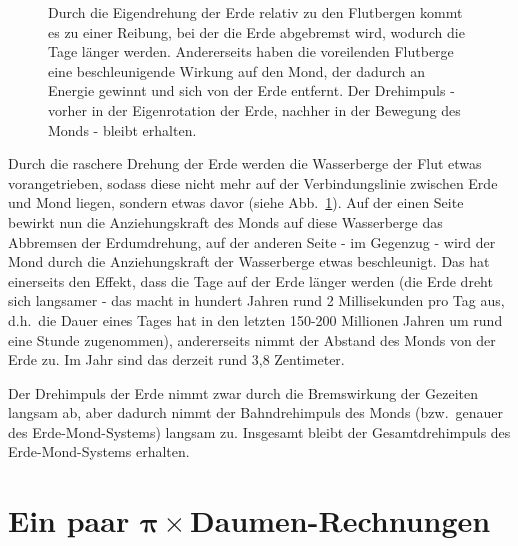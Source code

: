 \begin{figure}[htb]
%
\caption{\label{fig_Bremsen}%
Durch die Eigendrehung der Erde relativ zu den Flutbergen kommt es zu einer
\glqq Reibung\grqq, bei der die Erde abgebremst wird, wodurch die Tage 
l\"anger werden. Andererseits haben die voreilenden Flutberge eine beschleunigende
Wirkung auf den Mond, der
dadurch an Energie gewinnt und sich von der Erde entfernt. Der Drehimpuls - vorher
in der Eigenrotation der Erde, nachher in der Bewegung des Monds - bleibt erhalten.}
\end{figure}

Durch die raschere Drehung der Erde werden die Wasserberge der Flut etwas
vorangetrieben, sodass diese nicht mehr auf der Verbindungslinie zwischen Erde und
Mond liegen, sondern etwas davor (siehe Abb.\ \ref{fig_Bremsen}). Auf der einen Seite
bewirkt nun die Anziehungskraft des Monds auf diese Wasserberge das Abbremsen
der Erdumdrehung, auf der anderen Seite - im Gegenzug - wird der Mond durch die
Anziehungskraft der Wasserberge etwas beschleunigt. Das hat einerseits den Effekt, dass
die Tage auf der Erde l\"anger werden (die Erde dreht sich langsamer - das macht in hundert
Jahren rund 2 Millisekunden pro Tag aus, d.h.\ die Dauer eines Tages hat in den letzten 150-200
Millionen Jahren um rund eine Stunde zugenommen), andererseits
nimmt der Abstand des Monds von der Erde zu. Im Jahr sind das derzeit rund 3,8 Zentimeter. 

Der Dreh\-impuls
der Erde nimmt zwar durch die Bremswirkung der Gezeiten langsam ab, aber dadurch
nimmt der Bahndrehimpuls des Monds (bzw.\ genauer des Erde-Mond-Systems) langsam
zu. Insgesamt bleibt der Gesamtdrehimpuls des Erde-Mond-Systems erhalten. 

\section{Ein paar \glqq $\pmb{\pi} \times$Daumen\grqq-Rechnungen}

